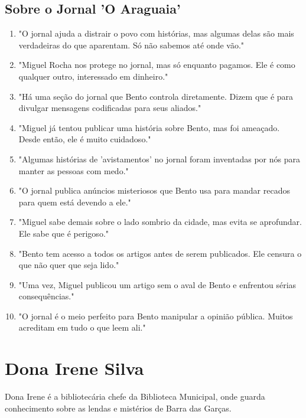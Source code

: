 \subsection*{Sobre o Jornal 'O Araguaia'}
\begin{enumerate}
    \item "O jornal ajuda a distrair o povo com histórias, mas algumas delas são mais verdadeiras do que aparentam. Só não sabemos até onde vão."
    \item "Miguel Rocha nos protege no jornal, mas só enquanto pagamos. Ele é como qualquer outro, interessado em dinheiro."
    \item "Há uma seção do jornal que Bento controla diretamente. Dizem que é para divulgar mensagens codificadas para seus aliados."
    \item "Miguel já tentou publicar uma história sobre Bento, mas foi ameaçado. Desde então, ele é muito cuidadoso."
    \item "Algumas histórias de 'avistamentos' no jornal foram inventadas por nós para manter as pessoas com medo."
    \item "O jornal publica anúncios misteriosos que Bento usa para mandar recados para quem está devendo a ele."
    \item "Miguel sabe demais sobre o lado sombrio da cidade, mas evita se aprofundar. Ele sabe que é perigoso."
    \item "Bento tem acesso a todos os artigos antes de serem publicados. Ele censura o que não quer que seja lido."
    \item "Uma vez, Miguel publicou um artigo sem o aval de Bento e enfrentou sérias consequências."
    \item "O jornal é o meio perfeito para Bento manipular a opinião pública. Muitos acreditam em tudo o que leem ali."
\end{enumerate}

\section{Dona Irene Silva}
Dona Irene é a bibliotecária chefe da Biblioteca Municipal, onde guarda conhecimento sobre as lendas e mistérios de Barra das Garças.

